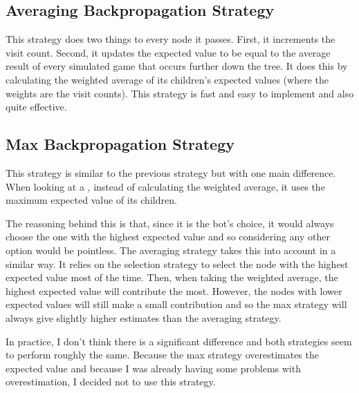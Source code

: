 

\subsection{Averaging Backpropagation Strategy}		%

This strategy does two things to every node it passes. First, it increments the visit count. Second, it updates the expected value to be equal to the average result of every simulated game that occurs further down the tree. It does this by calculating the weighted average of its children's expected values (where the weights are the visit counts). This strategy is fast and easy to implement and also quite effective.



\subsection{Max Backpropagation Strategy}			%

This strategy is similar to the previous strategy but with one main difference. When looking at a \choice, instead of calculating the weighted average, it uses the maximum expected value of its children. 

The reasoning behind this is that, since it is the bot's choice, it would always choose the one with the highest expected value and so considering any other option would be pointless. The averaging strategy takes this into account in a similar way. It relies on the selection strategy to select the node with the highest expected value most of the time. Then, when taking the weighted average, the highest expected value will contribute the most. However, the nodes with lower expected values will still make a small contribution and so the max strategy will always give slightly higher estimates than the averaging strategy.

In practice, I don't think there is a significant difference and both strategies seem to perform roughly the same. Because the max strategy overestimates the expected value and because I was already having some problems with overestimation, I decided not to use this strategy.


